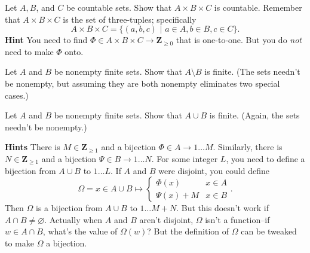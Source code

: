 \documentclass[12pt,fleqn,answers]{exam}
\newcommand{\integers}{\mathbf{Z}}
\begin{document}
\begin{questions} 

\question [10] Let $A,B$, and $C$ be countable sets. Show that $A \times B \times C$
is countable.  Remember that  $A \times B \times C$ is the set of three-tuples; specifically
\begin{equation*}
    A \times B \times C = \{(a,b,c) \,\,| \,\, a \in A, b \in B, c \in C \}.
\end{equation*}
\textbf{Hint} You need to find $\Phi \in A \times B \times C \to \integers_{\geq 0}$
that is one-to-one. But you do \emph{not} need to make $\Phi$ onto. 

\question [10]  Let $A$ and $B$ be nonempty finite sets. Show that $A \setminus B$ 
is finite. (The sets needn't be nonempty, but assuming they are both
nonempty eliminates two special cases.)
\begin{solution}

\end{solution}
\question [10] Let $A$ and $B$ be nonempty finite sets. Show that $A \cup B$ 
is finite. (Again, the sets needn't be nonempty.)
\begin{solution}

\end{solution}
    

\textbf{Hints} There is $M \in \integers_{\geq 1}$ and a 
bijection $\Phi \in A \to 1 \dots M$. Similarly, there is 
$N \in \integers_{\geq 1}$ and a bijection $\Psi \in B \to 1 \dots N$.
For some integer $L$, you need to define a bijection from $A \cup B$ 
to $ 1 \dots L$. If $A$ and $B$ were disjoint, you 
could define 
\begin{equation*}
  \Omega = x \in A \cup B \mapsto 
   \begin{cases} 
      \Phi(x) & x \in A \\
      \Psi(x) + M & x \in B
   \end{cases}.
\end{equation*}
Then $\Omega$ is a bijection from $A \cup B$ to $1 \dots M + N$.
But this doesn't work if $A \cap B \neq \varnothing$. Actually
when $A$ and $B$ aren't disjoint, $ \Omega$ isn't a function--if
$w \in A \cap B$, what's the value of $\Omega(w)$? 
But the definition of $\Omega$ can be tweaked to make 
$\Omega$ a bijection.

\begin{solution}

\end{solution}

\end{questions}
\end{document}
